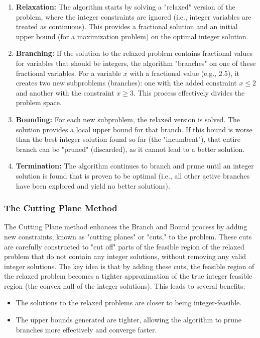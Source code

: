 \begin{enumerate}
    \item \textbf{Relaxation:} The algorithm starts by solving a "relaxed" version of the problem, where the integer constraints are ignored (i.e., integer variables are treated as continuous). This provides a fractional solution and an initial upper bound (for a maximization problem) on the optimal integer solution.
    
    \item \textbf{Branching:} If the solution to the relaxed problem contains fractional values for variables that should be integers, the algorithm "branches" on one of these fractional variables. For a variable $x$ with a fractional value (e.g., 2.5), it creates two new subproblems (branches): one with the added constraint $x \le 2$ and another with the constraint $x \ge 3$. This process effectively divides the problem space.
    
    \item \textbf{Bounding:} For each new subproblem, the relaxed version is solved. The solution provides a local upper bound for that branch. If this bound is worse than the best integer solution found so far (the "incumbent"), that entire branch can be "pruned" (discarded), as it cannot lead to a better solution.
    
    \item \textbf{Termination:} The algorithm continues to branch and prune until an integer solution is found that is proven to be optimal (i.e., all other active branches have been explored and yield no better solutions).
\end{enumerate}

\subsubsection{The Cutting Plane Method}
The Cutting Plane method enhances the Branch and Bound process by adding new constraints, known as "cutting planes" or "cuts," to the problem. These cuts are carefully constructed to "cut off" parts of the feasible region of the relaxed problem that do not contain any integer solutions, without removing any valid integer solutions.
\noindent
The key idea is that by adding these cuts, the feasible region of the relaxed problem becomes a tighter approximation of the true integer feasible region (the convex hull of the integer solutions). This leads to several benefits:
\begin{itemize}
    \item The solutions to the relaxed problems are closer to being integer-feasible.
    \item The upper bounds generated are tighter, allowing the algorithm to prune branches more effectively and converge faster.
\end{itemize}

